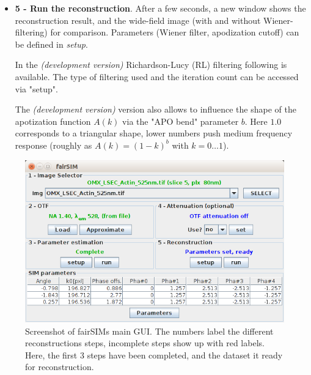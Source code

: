\documentclass[twoside=false,
           twocolumn=false,
           a4paper,DIV=15,
           10pt]{scrartcl}
\newcommand{\devmarker}{\textit{(development version) }}
\begin{document}
\begin{itemize}
\item \textbf{5 - Run the reconstruction}. After a few seconds,
a new window shows the reconstruction result, and the wide-field
image (with and without Wiener-filtering) for comparison.
Parameters (Wiener filter, apodization cutoff) can be defined in
\emph{setup}.

In the \devmarker Richardson-Lucy (RL) filtering following \cite{perez2016optimal} is available. The type of filtering used and
the iteration count can be accessed via "setup".

The \devmarker version also allows to influence the shape 
of the apotization function $A(k)$ via the "APO bend" parameter $b$. Here
$1.0$ corresponds to a triangular shape, lower numbers push
medium frequency response (roughly as $A(k) = (1-k)^b$ 
with $k=0\dots1$).


\end{itemize}



\begin{figure}
\begin{center}
\includegraphics[width=.7\textwidth]{../figures/fairSIM-screenshot}
\end{center}
\caption{Screenshot of fairSIMs main GUI. The numbers label the different
reconstructions steps, incomplete steps show up with red labels. Here,
the first 3 steps have been completed, and the dataset it ready for
reconstruction.}
\label{fig-gui}
\end{figure}
\end{document}
